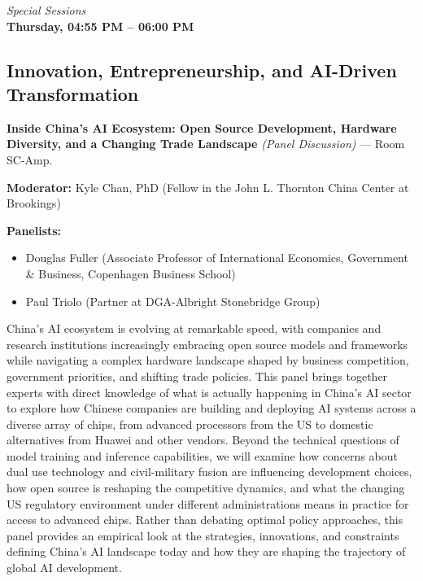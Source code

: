 \documentclass[
  10pt,
  letterpaper,
  DIV=11,
  numbers=noendperiod]{scrartcl}
\providecommand{\tightlist}{%
  \setlength{\itemsep}{0pt}\setlength{\parskip}{0pt}}\usepackage{longtable,booktabs,array}
\begin{document}
\newpage


\begin{center}
\normalsize\textit{Special Sessions}\\[0.3em]
\Large\textbf{Thursday, 04:55 PM – 06:00 PM}
\end{center}

\subsection{\texorpdfstring{\textcolor{innovation}{Innovation, Entrepreneurship, and AI-Driven Transformation}}{}}\label{section-47}

\textbf{Inside China's AI Ecosystem: Open Source Development, Hardware
Diversity, and a Changing Trade Landscape} \emph{(Panel Discussion)} ---
Room SC-Amp.

\textbf{Moderator:} Kyle Chan, PhD (Fellow in the John L. Thornton China
Center at Brookings)

\textbf{Panelists:}

\begin{itemize}
\tightlist
\item
  Douglas Fuller (Associate Professor of International Economics,
  Government \& Business, Copenhagen Business School)
\item
  Paul Triolo (Partner at DGA-Albright Stonebridge Group)
\end{itemize}

China's AI ecosystem is evolving at remarkable speed, with companies and
research institutions increasingly embracing open source models and
frameworks while navigating a complex hardware landscape shaped by
business competition, government priorities, and shifting trade
policies. This panel brings together experts with direct knowledge of
what is actually happening in China's AI sector to explore how Chinese
companies are building and deploying AI systems across a diverse array
of chips, from advanced processors from the US to domestic alternatives
from Huawei and other vendors. Beyond the technical questions of model
training and inference capabilities, we will examine how concerns about
dual use technology and civil-military fusion are influencing
development choices, how open source is reshaping the competitive
dynamics, and what the changing US regulatory environment under
different administrations means in practice for access to advanced
chips. Rather than debating optimal policy approaches, this panel
provides an empirical look at the strategies, innovations, and
constraints defining China's AI landscape today and how they are shaping
the trajectory of global AI development.
\end{document}
